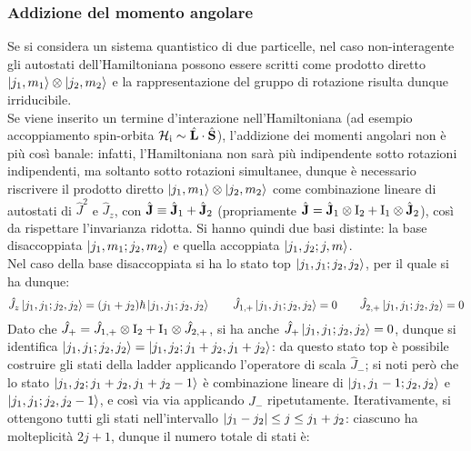 \subsubsection{Addizione del momento angolare}

Se si considera un sistema quantistico di due particelle, nel caso non-interagente gli autostati dell'Hamiltoniana possono essere scritti come prodotto diretto $ \ket{j_1,m_1} \otimes \ket{j_2,m_2} $ e la rappresentazione del gruppo di rotazione risulta dunque irriducibile.\\
Se viene inserito un termine d'interazione nell'Hamiltoniana (ad esempio accoppiamento spin-orbita $ \mathcal{H}_{\text{i}} \sim \hat{\mathbf{L}} \cdot \hat{\mathbf{S}} $), l'addizione dei momenti angolari non è più così banale: infatti, l'Hamiltoniana non sarà più indipendente sotto rotazioni indipendenti, ma soltanto sotto rotazioni simultanee, dunque è necessario riscrivere il prodotto diretto $ \ket{j_1,m_1} \otimes \ket{j_2,m_2} $ come combinazione lineare di autostati di $ \hat{J}^2 $ e $ \hat{J}_z $, con $ \hat{\mathbf{J}} \equiv \hat{\mathbf{J}}_1 + \hat{\mathbf{J}}_2 $ (propriamente $ \hat{\mathbf{J}} = \hat{\mathbf{J}}_1 \otimes \mathrm{I}_2 + \mathrm{I}_1 \otimes \hat{\mathbf{J}}_2 $), così da rispettare l'invarianza ridotta. Si hanno quindi due basi distinte: la base disaccoppiata $ \ket{j_1,m_1 ; j_2,m_2} $ e quella accoppiata $ \ket{j_1,j_2 ; j,m} $.\\
Nel caso della base disaccoppiata si ha lo stato top $ \ket{j_1, j_1 ; j_2, j_2} $, per il quale si ha dunque:
\begin{equation*}
	\hat{J}_z \ket{j_1,j_1 ; j_2,j_2} = (j_1 + j_2) \hbar \ket{j_1,j_1 ; j_2,j_2}
	\qquad
	\hat{J}_{1,+} \ket{j_1,j_1 ; j_2,j_2} = 0
	\qquad
	\hat{J}_{2,+} \ket{j_1,j_1 ; j_2,j_2} = 0
\end{equation*}
Dato che $ \hat{J}_+ = \hat{J}_{1,+} \otimes \mathrm{I}_2 + \mathrm{I}_1 \otimes \hat{J}_{2,+} $, si ha anche $ \hat{J}_+ \ket{j_1,j_1 ; j_2,j_2} = 0 $, dunque si identifica $ \ket{j_1,j_1 ; j_2,j_2} = \ket{j_1,j_2 ; j_1 + j_2, j_1 + j_2} $: da questo stato top è possibile costruire gli stati della ladder applicando l'operatore di scala $ \hat{J}_- $; si noti però che lo stato $ \ket{j_1,j_2 ; j_1 + j_2 , j_1 + j_2 - 1} $ è combinazione lineare di $ \ket{j_1,j_1 - 1 ; j_2,j_2} $ e $ \ket{j_1,j_1 ; j_2, j_2 - 1} $, e così via via applicando $ \hat{J}_- $ ripetutamente. Iterativamente, si ottengono tutti gli stati nell'intervallo $ \left\lvert j_1 - j_2\right\rvert \le j \le j_1 + j_2 $: ciascuno ha molteplicità $ 2j + 1 $, dunque il numero totale di stati è:
